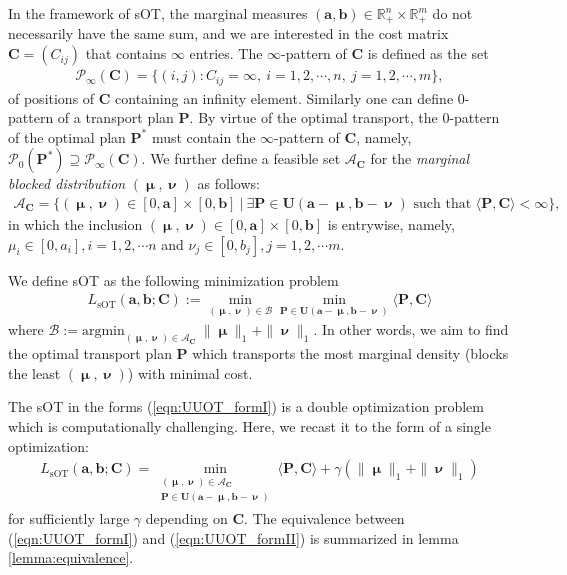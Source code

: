 \documentclass[11pt]{book}
\begin{document}
In the framework of sOT, the marginal measures $(\mathbf{a},\mathbf{b})\in\mathbb{R}_+^n\times\mathbb{R}_+^m$ do not necessarily have the same sum, and we are interested in the cost matrix $\mathbf{C} = (C_{ij})$ that contains $\infty$ entries. The $\infty$-pattern of $\mathbf{C}$ is defined as the set
\begin{align}\label{eqn:infinifty_pattern}
\mathcal{P}_{\infty}(\mathbf{C})  = \{ (i,j): C_{ij} = \infty, \ i = 1,2,\cdots,n, \ j = 1,2,\cdots,m \},
\end{align}
of positions of $\mathbf{C}$ containing an infinity element. Similarly one can define 0-pattern of a transport plan $\mathbf{P}$. By virtue of the optimal transport, the 0-pattern of the optimal plan $\mathbf{P}^*$ must contain the $\infty$-pattern of $\mathbf{C}$, namely, $\mathcal{P}_0(\mathbf{P}^*)\supseteq \mathcal{P}_{\infty}(\mathbf{C})$. We further define a feasible set $\mathcal{A}_{\mathbf{C}}$ for the {\it{marginal blocked distribution}} $(\boldsymbol\upmu,\boldsymbol\upnu)$ as follows:
\begin{align}
\mathcal{A}_{\mathbf{C}} = \Big\{ (\boldsymbol\upmu,\boldsymbol\upnu)\in[0,\mathbf{a}]\times[0,\mathbf{b}] \ \Big|\ \exists \mathbf{P} \in \mathbf{U}(\mathbf{a}-\boldsymbol\upmu, \mathbf{b}-\boldsymbol\upnu) \text{\ such\ that\ } \langle \mathbf{P}, \mathbf{C} \rangle < \infty \Big\},
\end{align}
in which the inclusion $(\boldsymbol\upmu,\boldsymbol\upnu)\in[0,\mathbf{a}]\times[0,\mathbf{b}]$ is entrywise, namely, $\mu_i\in[0,a_i], i=1,2,\cdots n$ and $\nu_j\in[0,b_j], j=1,2,\cdots m$. 

We define sOT as the following minimization problem
\begin{align}\label{eqn:UUOT_formI}
L_{\text{sOT}}(\mathbf{a},\mathbf{b};\mathbf{C}) := \min_{(\boldsymbol\upmu,\boldsymbol\upnu)\in\mathcal{B}} \min_{\mathbf{P}\in \mathbf{U}(\mathbf{a}-\boldsymbol\upmu, \mathbf{b}-\boldsymbol\upnu)} \langle \mathbf{P}, \mathbf{C} \rangle 
\end{align}
where $\mathcal{B}:= \text{argmin}_{(\boldsymbol\upmu,\boldsymbol\upnu)\in\mathcal{A}_{\mathbf{C}}}\  \|\boldsymbol\upmu\|_1 + \|\boldsymbol\upnu\|_1$. In other words, we aim to find the optimal transport plan $\mathbf{P}$ which transports the most marginal density (blocks the least $(\boldsymbol\upmu,\boldsymbol\upnu)$) with minimal cost.

The sOT in the forms (\ref{eqn:UUOT_formI}) is a double optimization problem which is computationally challenging. Here, we recast it to the form of a single optimization:
\begin{align}\label{eqn:UUOT_formII}
L_{\text{sOT}}(\mathbf{a},\mathbf{b};\mathbf{C}) = \min_{\substack{(\boldsymbol\upmu,\boldsymbol\upnu)\in\mathcal{A}_{\mathbf{C}}\\ \mathbf{P}\in \mathbf{U}(\mathbf{a}-\boldsymbol\upmu,\mathbf{b}-\boldsymbol\upnu)}} \langle \mathbf{P}, \mathbf{C} \rangle + \gamma(\|\boldsymbol\upmu\|_1 + \|\boldsymbol\upnu\|_1) 
\end{align}
for sufficiently large $\gamma$ depending on $\mathbf{C}$. The equivalence between (\ref{eqn:UUOT_formI}) and (\ref{eqn:UUOT_formII}) is summarized in lemma \ref{lemma:equivalence}. 
\end{document}
